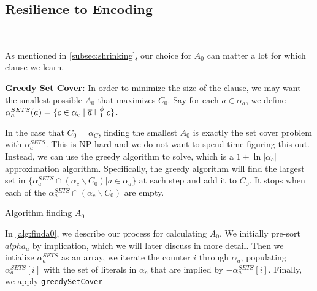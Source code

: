 \subsection{Resilience to Encoding}~\label{subsec:sym}

As mentioned in \autoref{subsec:shrinking}, our choice for $A_0$ can matter a lot for which clause we learn. 


\noindent \textbf{Greedy Set Cover:} %
In order to minimize the size of the clause, we may want the smallest possible $A_0$ that maximizes $C_0$. Say for each $a \in \alpha_a$, we define $\alpha_a^{SETS}(a) = \{ c \in \alpha_c \; | \; \overline{a} \vdash_1^\phi c\}$. 

In the case that $C_0 = \alpha_C$, finding the smallest $A_0$ is exactly the set cover problem with $\alpha_a^{SETS}$. This is NP-hard and we do not want to spend time figuring this out. Instead, we can use the greedy algorithm to solve, which is a $1 + \ln |\alpha_c|$ approximation algorithm. Specifically, the greedy algorithm will find the largest set in $\{\alpha_a^{SETS} \cap (\alpha_c \backslash C_0) | a \in \alpha_a \}$ at each step and add it to $C_0$. It stops when each of the $\alpha_a^{SETS} \cap (\alpha_c \backslash C_0)$ are empty.


\begin{algorithm}
    \caption{Algorithm finding $A_0$}\label{alg:finda0}
    \SetAlgoNoLine

\end{algorithm}

In \autoref{alg:finda0}, we describe our process for calculating $A_0$. We initially pre-sort $alpha_a$ by implication, which we will later discuss in more detail. Then we intialize $\alpha_a^{SETS}$ as an array, we iterate the counter $i$ through $\alpha_a$, populating $\alpha_a^{SETS}[i]$ with the set of literals in $\alpha_c$ that are implied by $-\alpha_a^{SETS}[i]$. Finally, we apply \texttt{greedySetCover}



